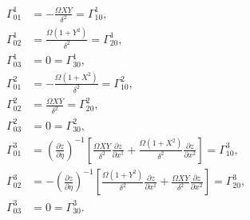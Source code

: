 \documentclass{article}
\begin{document}
\begin{align}
\Gamma^1_{01}&=-\frac{\Omega XY}{\delta^2}=\Gamma^1_{10}, \\
\Gamma^1_{02}&=\frac{\Omega (1+Y^2)}{\delta^2}=\Gamma^1_{20}, \\
\Gamma^1_{03}&=0=\Gamma^1_{30}, \\
\Gamma^2_{01}&=-\frac{\Omega (1+X^2)}{\delta^2}=\Gamma^2_{10}, \\
\Gamma^2_{02}&=\frac{\Omega XY}{\delta^2}=\Gamma^2_{20}, \\
\Gamma^2_{03}&=0=\Gamma^2_{30}, \\
\Gamma^3_{01}&=\left(\frac{\partial z}{\partial \eta}\right)^{-1}\left[ \frac{\Omega XY}{\delta^2} \frac{\partial z}{\partial x^1}+ \frac{\Omega (1+X^2)}{\delta^2} \frac{\partial z}{\partial x^2}  \right]=\Gamma^3_{10}, \\
\Gamma^3_{02}&=-\left(\frac{\partial z}{\partial \eta}\right)^{-1}\left[ \frac{\Omega (1+Y^2)}{\delta^2} \frac{\partial z}{\partial x^1}+\frac{\Omega XY}{\delta^2}\frac{\partial z}{\partial x^2}  \right]=\Gamma^3_{20}, \\
\Gamma^3_{03}&=0=\Gamma^3_{30}.
\end{align}
\end{document}
